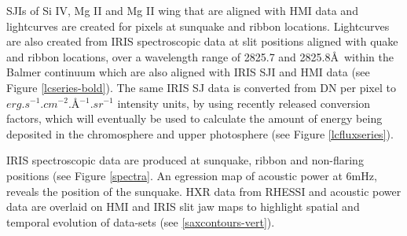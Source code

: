 SJIs of Si IV, Mg II and Mg II wing that are aligned with HMI data and lightcurves are created for pixels at sunquake and ribbon locations. Lightcurves are also created from IRIS spectroscopic data at slit positions aligned with quake and ribbon locations, over a wavelength range of 2825.7 and 2825.8\AA\ within the Balmer continuum which are also aligned with IRIS SJI and HMI data (see Figure \ref{lcseries-bold}). The same IRIS SJ data is converted from DN per pixel to $erg.s^{-1}.cm^{-2}.$\AA$^{-1}.sr^{-1}$ intensity units, by using recently released conversion factors, which will eventually be used to calculate the amount of energy being deposited in the chromosphere and upper photosphere (see Figure \ref{lcfluxseries}).   

IRIS spectroscopic data are produced at sunquake, ribbon and non-flaring positions (see Figure \ref{spectra}. An egression map of acoustic power  at 6mHz, reveals the position of the sunquake. HXR data from RHESSI and acoustic power data are overlaid on HMI and IRIS slit jaw maps to highlight spatial and temporal evolution of data-sets (see \ref{saxcontours-vert}).\\

